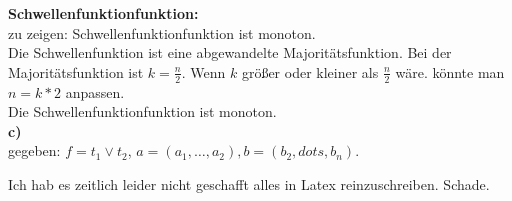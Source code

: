\documentclass[a4paper]{scrartcl}
\begin{document}
\begin{flushleft}
		\textbf{Schwellenfunktionfunktion:}\\
		zu zeigen: Schwellenfunktionfunktion ist monoton.\\
		Die Schwellenfunktion ist eine abgewandelte Majoritätsfunktion. Bei der Majoritätsfunktion ist $k=\frac{n}{2}$. Wenn $k$ größer oder kleiner als $\frac{n}{2}$ wäre. könnte man $n=k*2$ anpassen.\\
		Die Schwellenfunktionfunktion ist monoton.\\[1em]

		\textbf{c)}\\
		gegeben: $f=t_1\vee t_2$, $a=(a_1,\dots,a_2),b=(b_2,dots,b_n)$.\\
		
 	\end{flushleft}
 	
 	Ich hab es zeitlich leider nicht geschafft alles in Latex reinzuschreiben. Schade.
 	
\end{document}

